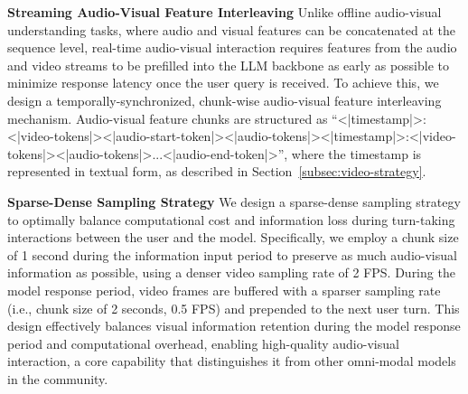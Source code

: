 \documentclass{article}
\begin{document}
\textbf{Streaming Audio-Visual Feature Interleaving} Unlike offline audio-visual understanding tasks, where audio and visual features can be concatenated at the sequence level, real-time audio-visual interaction requires features from the audio and video streams to be prefilled into the LLM backbone as early as possible to minimize response latency once the user query is received.
To achieve this, we design a temporally-synchronized, chunk-wise audio-visual feature interleaving mechanism. %
Audio-visual feature chunks are structured as ``<|timestamp|>:<|video-tokens|><|audio-start-token|><|audio-tokens|><|timestamp|>:<|video-tokens|><|audio-tokens|>...<|audio-end-token|>'', where the timestamp is represented in textual form, as described in Section~\ref{subsec:video-strategy}.


\textbf{Sparse-Dense Sampling Strategy} We design a sparse-dense sampling strategy to optimally balance computational cost and information loss during turn-taking interactions between the user and the model.
Specifically, we employ a chunk size of 1 second during the information input period to preserve as much audio-visual information as possible, using a denser video sampling rate of 2 FPS. During the model response period, video frames are buffered with a sparser sampling rate (i.e., chunk size of 2 seconds, 0.5 FPS) and prepended to the next user turn. This design effectively balances visual information retention during the model response period and computational overhead, enabling high-quality audio-visual interaction, a core capability that distinguishes it from other omni-modal models in the community. 
\end{document}
